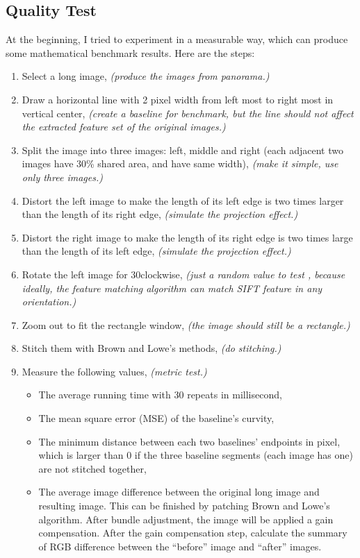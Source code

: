 \documentclass[10pt,twocolumn,letterpaper]{article}
\begin{document}
\subsection{Quality Test}
At the beginning, I tried to experiment in a measurable way, which can produce some mathematical benchmark results. Here are the steps:
\begin{enumerate}
    \item Select a long image, \textit{(produce the images from panorama.)}
    \item Draw a horizontal line with 2 pixel width from left most to right most in vertical center, \textit{(create a baseline for benchmark, but the line should not affect the extracted feature set of the original images.)}
    \item \label{bm:sp} Split the image into three images: left, middle and right (each adjacent two images have 30\% shared area, and have same width), \textit{(make it simple, use only three images.)}
    \item Distort the left image to make the length of its left edge is two times larger than the length of its right edge, \textit{(simulate the projection effect.)}
    \item Distort the right image to make the length of its right edge is two times large than the length of its left edge, \textit{(simulate the projection effect.)}
    \item Rotate the left image for 30\degree clockwise, \textit{(just a random value to test , because ideally, the feature matching algorithm can match SIFT feature in any orientation.)}
    \item \label{bm:zoom} Zoom out to fit the rectangle window, \textit{(the image should still be a rectangle.)}
    \item Stitch them with Brown and Lowe's methods, \textit{(do stitching.)}
    \item Measure the following values, \textit{(metric test.)} 
    \begin{itemize}
        \item The average running time with 30 repeats in millisecond,
        \item The mean square error (MSE) of the baseline's curvity,
        \item The minimum distance between each two baselines' endpoints in pixel,
              which is larger than 0 if the three baseline segments (each image has one) are not stitched together,
        \item The average image difference between the original long image and resulting image.
              This can be finished by patching Brown and Lowe's algorithm. After bundle adjustment, the image will be applied a gain compensation.
              After the gain compensation step, calculate the summary of RGB difference between the ``before'' image and ``after'' images.
    \end{itemize}
\end{enumerate}
\end{document}
